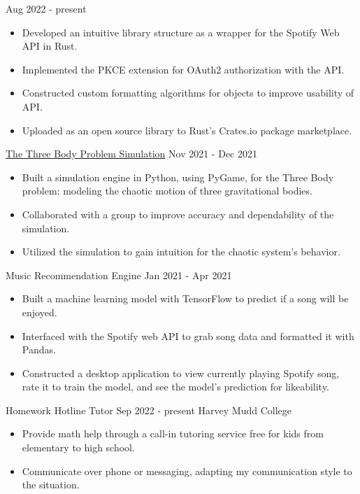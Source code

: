\documentclass[9pt]{resume}
\begin{document}
\begin{experiencelist}
            {Aug 2022 - present}
            {}
            {\begin{itemize}[noitemsep, topsep=1pt]
                \item Developed an intuitive library structure as a wrapper for the Spotify Web API in Rust. 
                \item Implemented the PKCE extension for OAuth2 authorization with the API. 
                \item Constructed custom formatting algorithms for objects to improve usability of API.
                \item Uploaded as an open source library to Rust's Crates.io package marketplace.
            \end{itemize}}
        \experience
            {\href{https://github.com/TheSharkhead2/third_body_simulation}{The Three Body Problem Simulation}}
            {Nov 2021 - Dec 2021}
            {}
            {\begin{itemize}[noitemsep, topsep=1pt]
                \item Built a simulation engine in Python, using PyGame, for the Three Body problem: modeling the chaotic motion of three gravitational bodies. 
                \item Collaborated with a group to improve accuracy and dependability of the simulation.
                \item Utilized the simulation to gain intuition for the chaotic system's behavior.
            \end{itemize}}
        \experience
            {Music Recommendation Engine}
            {Jan 2021 - Apr 2021}
            {}
            {\begin{itemize}[noitemsep, topsep=1pt]
                \item Built a machine learning model with TensorFlow to predict if a song will be enjoyed.
                \item Interfaced with the Spotify web API to grab song data and formatted it with Pandas. 
                \item Constructed a desktop application to view currently playing Spotify song, rate it to train the model, and see the model's prediction for likeability. 
            \end{itemize}}
    \end{experiencelist}
    \vspace{-0.4cm}
    \begin{experiencelist}
        \experience
            {Homework Hotline Tutor}
            {Sep 2022 - present} 
            {Harvey Mudd College}
            {\begin{itemize}[noitemsep, topsep=1pt]
                \item Provide math help through a call-in tutoring service free for kids from elementary to high school.
                \item Communicate over phone or messaging, adapting my communication style to the situation.
            \end{itemize}}
    \end{experiencelist}
\end{document}

